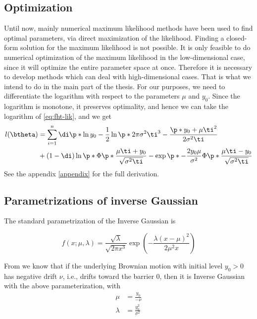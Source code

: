\subsection{Optimization}
Until now, mainly numerical maximum likelihood methods have been used to find optimal parameters, via direct maximization of the likelihood. Finding a closed-form solution for the maximum likelihood is not possible. It is only feasible to do numerical optimization of the maximum likelihood in the low-dimensional case, since it will optimize the entire parameter space at once. Therefore it is necessary to develop methods which can deal with high-dimensional cases. That is what we intend to do in the main part of the thesis. For our purposes, we need to differentiate the logarithm with respect to the parameters $\mu$ and $y_0$. Since the logarithm is monotone, it preserves optimality, and hence we can take the logarithm of \eqref{eq:fht-lik}, and we get
\begin{align}\label{eq:loglik}
\begin{split}
    l(\btheta)&=\sum_{i=1}^n\di\p*{\ln y_0-\frac{1}{2}\ln\p*{2\pi\sigma^2\ti^3}-\frac{\p*{y_0+\mu\ti}^2}{2\sigma^2\ti}} \\
    &+
    (1-\di)\ln\p*{\Phi\p*{\frac{\mu\ti+y_0}{\sqrt{\sigma^2\ti}}}-\exp\p*{-\frac{2y_0\mu}{\sigma^2}}\Phi\p*{\frac{\mu\ti-y_0}{\sqrt{\sigma^2\ti}}}}
\end{split}
\end{align}
See the appendix \ref{appendix} for the full derivation.



\subsection{Parametrizations of inverse Gaussian}
The standard parametrization of the Inverse Gaussian is

\begin{equation*}
    f(x;\mu,\lambda)=
    \frac{\sqrt{\lambda}}{\sqrt{2\pi x^3}}\exp\left(-\frac{\lambda(x-\mu)^2}{2\mu^2x}\right)
\end{equation*}

From \citet{chhikara1988} we know that if the underlying Brownian motion with initial level $y_0>0$ has negative drift $\nu$, i.e., drifts toward the barrier 0, then it is Inverse Gaussian with the above parameterization, with
\begin{align*}
    \mu&=\frac{y_0}{-\nu} \\
    \lambda&=\frac{y_0^2}{\sigma^2}
\end{align*}